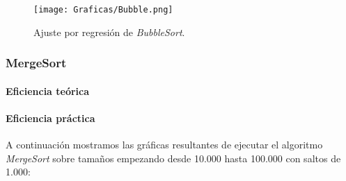 \documentclass[a4paper,12pt]{article} %
\begin{document}
\begin{figure}[H]
	\centering
	\texttt{[image: Graficas/Bubble.png]}
	\caption{Ajuste por regresión de \textit{BubbleSort}.}
\end{figure}


\subsubsection{MergeSort}
\paragraph{Eficiencia teórica}
\paragraph{Eficiencia práctica}

A continuación mostramos las gráficas resultantes de ejecutar el algoritmo \textit{MergeSort}
sobre tamaños empezando desde 10.000 hasta 100.000 con saltos de 1.000:
\end{document}
